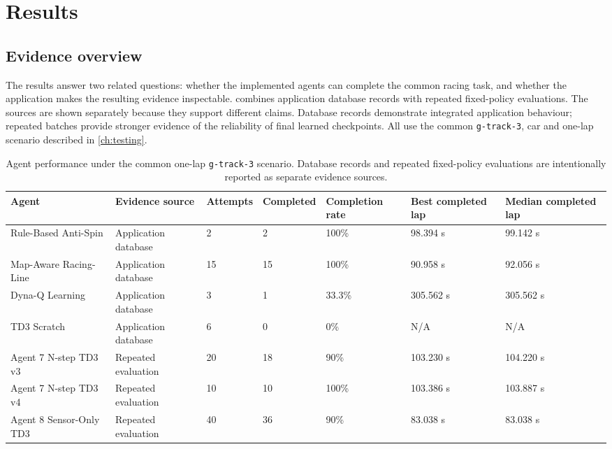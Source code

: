 \section{Results}
\label{ch:results}

\subsection{Evidence overview}

The results answer two related questions: whether the implemented agents can complete the common racing task, and whether the application makes the resulting evidence inspectable.  combines application database records with repeated fixed-policy evaluations. The sources are shown separately because they support different claims. Database records demonstrate integrated application behaviour; repeated batches provide stronger evidence of the reliability of final learned checkpoints. All use the common \texttt{g-track-3}, car and one-lap scenario described in \cref{ch:testing}.

\begin{table}[htbp]
  \centering
  \caption{Agent performance under the common one-lap \texttt{g-track-3} scenario. Database records and repeated fixed-policy evaluations are intentionally reported as separate evidence sources.}
  \label{tab:agent-results}
  \small
  \begin{tabularx}{\textwidth}{p{}p{}p{}p{}p{}YY}
    \toprule
    Agent & Evidence source & Attempts & Completed & Completion rate & Best completed lap & Median completed lap \\
    \midrule
    Rule-Based Anti-Spin & Application database & 2 & 2 & 100\% & 98.394 s & 99.142 s \\
    Map-Aware Racing-Line & Application database & 15 & 15 & 100\% & 90.958 s & 92.056 s \\
    Dyna-Q Learning & Application database & 3 & 1 & 33.3\% & 305.562 s & 305.562 s \\
    TD3 Scratch & Application database & 6 & 0 & 0\% & N/A & N/A \\
    Agent 7 N-step TD3 v3 & Repeated evaluation & 20 & 18 & 90\% & 103.230 s & 104.220 s \\
    Agent 7 N-step TD3 v4 & Repeated evaluation & 10 & 10 & 100\% & 103.386 s & 103.887 s \\
    Agent 8 Sensor-Only TD3 & Repeated evaluation & 40 & 36 & 90\% & 83.038 s & 83.038 s \\
    \bottomrule
  \end{tabularx}
\end{table}

